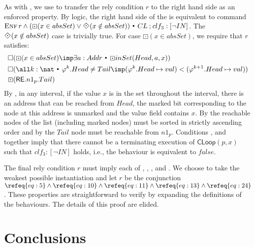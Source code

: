 \documentclass{article}
\def \reachable{{\sf RE}}
\newcommand{\st}{~{\scriptscriptstyle ^\bullet}~}
\def \enf {\mathop{\textsc{Enf}}}
\theoremstyle{plain}
\newcounter{thm}
\theoremstyle{definition}
\newcommand{\Always}{\textstyle\mathord{\boxdot}}
\newcommand{\Sometime}{\raisebox{0.1em}{\rotatebox[origin=c]{45}{$\textstyle\boxdot$}}}
\def\ch{\mathbin{;}}
\begin{document}
\smallskip

 As with , we use
 to transfer the rely condition $r$ to the
right hand side as an enforced property. By logic, the right hand side
of the  is equivalent to command $\enf r \land (\Always (x
\in absSet) \lor \Sometime(x \notin absSet)) \st CL \ch
clf_3:[\neg IN ]$.  The $\Sometime (x \notin absSet)$ case is trivially true. For
case $\Always (x \in absSet)$, we require that $r$ satisfies:
\begin{eqnarray}
& \Box 
(\Always (x \in absSet)  \imp 
  \exists a : Addr \st  
   \Always inSet(Head,a,x)
   )
\label{eq:11}
\\
& \Box(
\all k:\nat
\st \varphi^{k}.Head \neq Tail \imp
(\varphi^k.Head \mapsto val) < (\varphi^{k+1}.Head \mapsto val)
)
\label{eq:13}
\\
& 
\label{eq:24}
\Always (\reachable.n1_p.Tail)
\end{eqnarray}
By , in any interval, if the value $x$ is in the set
throughout the interval, there is an address that can be reached from
$Head$, the marked bit corresponding to the node at this address is
unmarked and the value field contains $x$. By  the
reachable nodes of the list (including marked nodes) must be sorted in
strictly ascending order and by  the $Tail$ node must be
reachable from $n1_p$. Conditions ,  and
 together imply that there cannot be a terminating
execution of $\mathsf{CLoop}(p,x)$ such that $clf_3:[\neg IN ]$ holds,
i.e., the behaviour is equivalent to $false$.


\smallskip 
{}
The final rely condition $r$ must imply each of , , ,  and . We choose to take the
weakest possible instantiation and let $r$ be the conjunction
$\refeq{eq:5} \land \refeq{eq:10} \land \refeq{eq:11} \land \refeq{eq:13} \land \refeq{eq:24}$. These
properties are straightforward to verify by expanding the definitions
of the behaviours. The details of this proof are elided.





\section{Conclusions}
\end{document}
